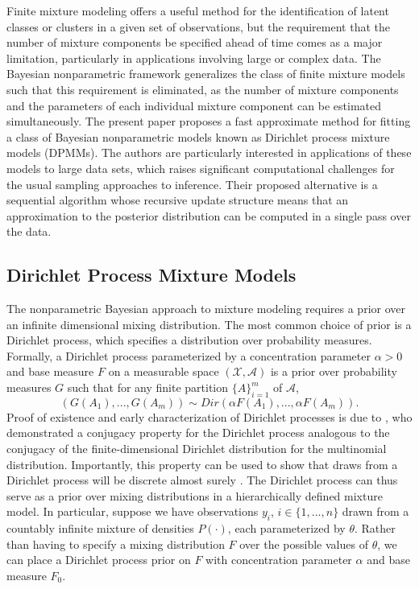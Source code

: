 \documentclass{uwstat572}
\begin{document}
Finite mixture modeling offers a useful method for the identification of latent classes or clusters in a given set of observations, but the requirement that the number of mixture components be specified ahead of time comes as a major limitation, particularly in applications involving large or complex data. The Bayesian nonparametric framework generalizes the class of finite mixture models such that this requirement is eliminated, as the number of mixture components and the parameters of each individual mixture component can be estimated simultaneously. The present paper \citep{zhang} proposes a fast approximate method for fitting a class of Bayesian nonparametric models known as Dirichlet process mixture models (DPMMs). The authors are particularly interested in applications of these models to large data sets, which raises significant computational challenges for the usual sampling approaches to inference. Their proposed alternative is a sequential algorithm whose recursive update structure means that an approximation to the posterior distribution can be computed in a single pass over the data.


\subsection{Dirichlet Process Mixture Models}

The nonparametric Bayesian approach to mixture modeling requires a prior over an infinite dimensional mixing distribution. The most common choice of prior is a Dirichlet process, which specifies a distribution over probability measures. Formally, a Dirichlet process parameterized by a concentration parameter $\alpha > 0$ and base measure $F$ on a measurable space $(\mathcal{X}, \mathcal{A})$ is a prior over probability measures $G$ such that for any finite partition $\{A\}_{i=1}^m$ of $\mathcal{A}$,
$$ (G(A_1), ...,G(A_m)) \sim Dir(\alpha F(A_1), ..., \alpha F(A_m)).$$
Proof of existence and early characterization of Dirichlet processes is due to \cite{ferguson}, who demonstrated a conjugacy property for the Dirichlet process analogous to the conjugacy of the finite-dimensional Dirichlet distribution for the multinomial distribution. Importantly, this property can be used to show that draws from a Dirichlet process will be discrete almost surely \citep{sudderth}. The Dirichlet process can thus serve as a prior over mixing distributions in a hierarchically defined mixture model. In particular, suppose we have observations $y_i$, $i \in \{1,...,n\}$ drawn from a countably infinite mixture of densities $P(\cdot)$, each parameterized by $\theta$. Rather than having to specify a mixing distribution $F$ over the possible values of $\theta$, we can place a Dirichlet process prior on $F$ with concentration parameter $\alpha$ and base measure $F_0$.
\end{document}
